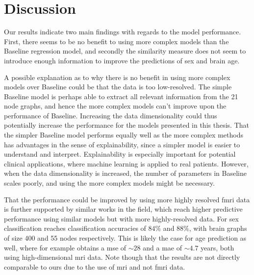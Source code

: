 \chapter{Discussion}
\label{chap:discussion}
    
Our results indicate two main findings with regards to the model performance. First, there seems to be no benefit to using more complex models than the Baseline regression model, and secondly the similarity measure does not seem to introduce enough information to improve the predictions of sex and brain age.

A possible explanation as to why there is no benefit in using more complex models over Baseline could be that the data is too low-resolved. The simple Baseline model is perhaps able to extract all relevant information from the 21 node graphs, and hence the more complex models can't improve upon the performance of Baseline. Increasing the data dimensionality could thus potentially increase the performance for the models presented in this thesis. That the simpler Baseline model performs equally well as the more complex methods has advantages in the sense of explainability, since a simpler model is easier to understand and interpret. Explainability is especially important for potential clinical applications, where machine learning is applied to real patients. However, when the data dimensionality is increased, the number of parameters in Baseline scales poorly, and using the more complex models might be necessary. 

That the performance could be improved by using more highly resolved \acrshort{fmri} data is further supported by similar works in the field, which reach higher predictive performance using similar models but with more highly-resolved data. For sex classification \cite{arslan, understanding_gnn} reaches classification accuracies of $84\%$ and $88\%$, with brain graphs of size 400 and 55 nodes respectively. This is likely the case for age prediction as well, where for example \cite{stankeviciute} obtains a \acrshort{mse} of $\sim28$ and \cite{amoroso_multiplex_age} a \acrshort{mae} of $\sim4.7$ years, both using high-dimensional \acrshort{mri} data. Note though that the results are not directly comparable to ours due to the use of \acrshort{mri} and not \acrshort{fmri} data.


